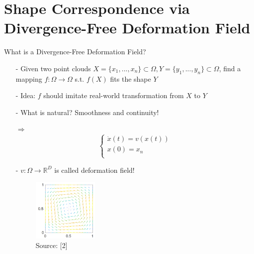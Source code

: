 \documentclass[xcolor=dvipsnames]{beamer}
\begin{document}
\section{Shape Correspondence via Divergence-Free Deformation Field}
\begin{frame}{What is a Divergence-Free Deformation Field?}
\begin{enumerate}
\item[-]Given two point clouds $X=\{x_1,...,x_n\} \subset \Omega, Y=\{y_1,...,y_n\}\subset \Omega$, find a mapping $f: \Omega \rightarrow \Omega$ s.t. $f(X)$ fits the shape $Y$
\item[-]Idea: $f$ should imitate real-world transformation from $X$ to $Y$
\item[-] What is natural? Smoothness and continuity!
\pause
\item[$\Rightarrow$]  \begin{equation*}
  	\begin{cases}
    \dot{x}(t) = v(x(t)) \\
    x(0) = x_n \\
    \end{cases}
    \end{equation*}
\item[-] $v: \Omega \rightarrow \mathbb{R}^D$ is called deformation field!
\begin{figure}
\includegraphics[height=3cm]{Pictures/deformation.png}
\caption*{Source: [2]}
\end{figure}
\end{enumerate}
\end{frame}
\end{document}
